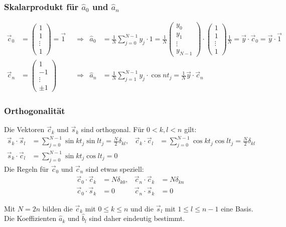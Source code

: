 \begin{frame}
\frametitle{Skalarprodukt für $\hat a_0$ und $\hat a_n$}
\begin{align*}
\vec{c}_0
&=
\begin{pmatrix}
1\\1\\\vdots\\1
\end{pmatrix}
=\vec{1}
&&\Rightarrow&
\hat a_0
&=
\frac1{N}
\sum_{j=0}^{N-1} y_j\cdot 1
=
\frac{1}{N}
\begin{pmatrix}y_0\\y_1\\\vdots\\y_{N-1}\end{pmatrix}
\cdot
\begin{pmatrix}1\\1\\\vdots\\1\end{pmatrix}
\frac{1}{N}
=
\vec{y}\cdot\vec{c}_0
=
\vec{y}\cdot\vec{1}
\\
\vec{c}_n
&=
\begin{pmatrix}1\\-1\\\vdots\\\pm1\end{pmatrix}
&&\Rightarrow&
\hat a_n
&=
\frac{1}{N}\sum_{j=1}^{N-1}y_j\cdot \cos nt_j
=
\frac{1}{N}\vec{y}\cdot\vec{c}_n
\end{align*}
\end{frame}

\begin{frame}
\frametitle{Orthogonalität}
Die Vektoren $\vec{c}_k$ und $\vec{s}_k$ sind orthogonal.
Für $0<k,l<n$ gilt:
\begin{equation}
\begin{aligned}
\vec{s}_k\cdot \vec{s}_l
&=
\sum_{j=0}^{N-1} \sin kt_j \sin lt_j = \frac{N}{2}\delta_{kl},
&
\vec{c}_k\cdot \vec{c}_l
&=
\sum_{j=0}^{N-1} \cos kt_j \cos lt_j = \frac{N}{2}\delta_{kl}
\\
\vec{s}_k\cdot \vec{c}_l
&=
\sum_{j=0}^{N-1} \sin kt_j \cos lt_j = 0
\end{aligned}
\label{ortho1}
\end{equation}
Die Regeln für $\vec{c}_0$ und $\vec{c}_n$ sind etwas speziell:
\begin{equation}
\begin{aligned}
\vec{c}_0\cdot \vec{c}_k&=N\delta_{k0},
&
\vec{c}_n\cdot \vec{c}_k&=N\delta_{kn}
\\
\vec{c}_0\cdot\vec{s}_k&=0
&
\vec{c}_n\cdot\vec{s}_k&=0
\end{aligned}
\label{ortho2}
\end{equation}
\begin{basis}
Mit $N=2n$ bilden die $\vec{c}_k$ mit $0\le k\le n$ und die
$\vec{s}_l$ mit $1\le l\le n-1$ eine Basis.
Die Koeffizienten $\hat a_k$ und $\hat b_l$ sind daher
eindeutig bestimmt.
\end{basis}
\end{frame}


